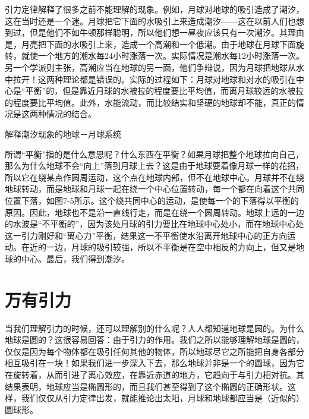 \documentclass[12pt,oneside]{book}
\begin{document}
引力定律解释了很多之前不能理解的现象。例如，月球对地球的吸引造成了潮汐，这在当时还是一个迷。月球把它下面的水吸引上来造成潮汐——这在以前人们也想到过，但是他们不如牛顿那样聪明，所以他们想一昼夜应该只有一次潮汐。其理由是，月亮把下面的水吸引上来，造成一个高潮和一个低潮。由于地球在月球下面旋转，就使一个地方的潮水每24小时涨落一次。实际情况是潮水每12小时涨落一次。另一个学派则主张，高潮应当在地球的另一面，他们争辩说，因为月球把地球从水中拉开！这两种理论都是错误的。实际的过程如下：月球对地球和对水的吸引在中心是“平衡”的，但是靠近月球的水被拉的程度要比平均值，而离月球较远的水被拉的程度要比平均值。此外，水能流动，而比较结实和坚硬的地球却不能，真正的情况是这两种情况的结合。
\begin{fig}{解释潮汐现象的地球－月球系统}
\caption{解释潮汐现象的地球－月球系统}
\label{fig:解释潮汐现象的地球－月球系统}
\end{fig}

所谓“平衡”指的是什么意思呢？什么东西在平衡？如果月球把整个地球拉向自己，那么为什么地球不会“向上”落到月球上去？这是由于地球耍着像月球一样的花招，所以它在绕某点作圆周运动，这个点在地球内部，但不在地球中心。月球并不在绕地球转动，而是地球和月球一起在绕一个中心位置转动，每一个都在向着这个共同位置下落，如图7-5所示。这个绕共同中心的运动，是使每一个的下落得以平衡的原因。因此，地球也不是沿一直线行走，而是在绕一个圆周转动。地球上远的一边的水波是“不平衡的”，因为该处月球的引力要比在地球中心处小，而在地球中心处这一引力刚好和“离心力”平衡，结果这一不平衡使水沿离开地球中心的正方向运动。在近的一边，月球的吸引较强，所以不平衡是在空中相反的方向上，但又是地球的中心。最后，我们得到潮汐。



\section{万有引力}
当我们理解引力的时候，还可以理解别的什么呢？人人都知道地球是圆的。为什么地球是圆的？这很容易回答：由于引力的作用。我们之所以能够理解地球是圆的，仅仅是因为每个物体都在吸引任何其他的物体，所以地球尽它之所能把自身各部分相互吸引在一块！如果我们进一步深入下去，那么地球并非是一个的圆球，因为它在旋转着，从而引进了离心效应，在靠近赤道的地方，它趋向于与引力相对抗。其结果表明，地球应当是椭圆形的，而且我们甚至得到了这个椭圆的正确形状。这样，我们仅仅从引力定律出发，就能推论出太阳，月球和地球都应当是（近似的）圆球形。
\end{document}
